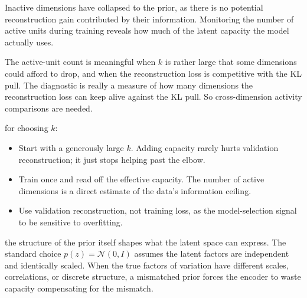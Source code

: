 
Inactive dimensions have collapsed to the prior, as there is no potential reconstruction gain contributed by their information.
Monitoring the number of active units during training reveals how much of the latent capacity the model actually uses\cite{BurdaGrosseSalakhutdinov2016}.

The active-unit count is meaningful when $k$ is rather large that some dimensions could afford to drop, 
and when the reconstruction loss is competitive with the KL pull.
The diagnostic is really a measure of how many dimensions the reconstruction loss can keep alive against the KL pull.
So cross-dimension activity comparisons are needed.

 for choosing $k$:
\begin{itemize}
    \item Start with a generously large $k$. Adding capacity rarely hurts validation reconstruction; it just stops helping past the elbow.
    \item Train once and read off the effective capacity. The number of active dimensions is a direct estimate of the data's information ceiling.
    \item Use validation reconstruction, not training loss, as the model-selection signal to be sensitive to overfitting.
\end{itemize}


 the structure of the prior itself shapes what the latent space can express.
The standard choice $p(z) = \mathcal{N}(0, I)$ assumes the latent factors are independent and identically scaled.
When the true factors of variation have different scales, correlations, or discrete structure, a mismatched prior forces the encoder to waste capacity compensating for the mismatch.



